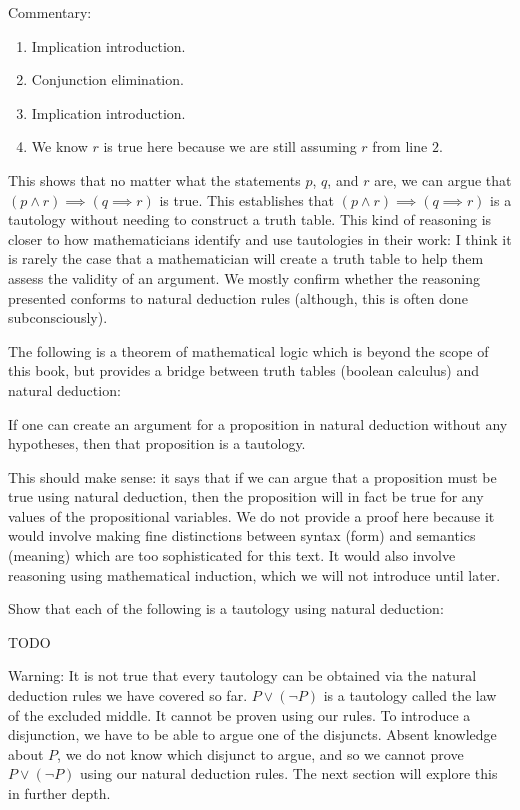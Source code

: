 Commentary:

\begin{enumerate}
	\item Implication introduction.
	\item Conjunction elimination.
	\item Implication introduction.
	\item We know $r$ is true here because we are still assuming $r$ from line $2$.
	\end{enumerate}

This shows that no matter what the statements $p$, $q$, and $r$ are, we can argue that $(p \wedge r) \implies ( q \implies r )$ is true.  This establishes that $(p \wedge r) \implies ( q \implies r )$ is a tautology without needing to construct a truth table.  This kind of reasoning is closer to how mathematicians identify and use tautologies in their work:  I think it is rarely the case that a mathematician will create a truth table to help them assess the validity of an argument.  We mostly confirm whether the reasoning presented conforms to natural deduction rules (although, this is often done subconsciously).

The following is a theorem of mathematical logic which is beyond the scope of this book, but provides a bridge between truth tables (boolean calculus) and natural deduction:

\begin{theorem}
	If one can create an argument for a proposition in natural deduction without any hypotheses, then that proposition is a tautology.
\end{theorem}

This should make sense:  it says that if we can argue that a proposition must be true using natural deduction, then the proposition will in fact be true for any values of the propositional variables.  We do not provide a proof here because it would involve making fine distinctions between syntax (form) and semantics (meaning) which are too sophisticated for this text.  It would also involve reasoning using mathematical induction, which we will not introduce until later.

\begin{xca}
		Show that each of the following is a tautology using natural deduction:
		
		TODO
	\end{xca}

Warning:  It is not true that every tautology can be obtained via the natural deduction rules we have covered so far.  $P \vee (\neg P)$ is a tautology called the law of the excluded middle. It cannot be proven using our rules.  To introduce a disjunction, we have to be able to argue one of the disjuncts.  Absent knowledge about $P$, we do not know which disjunct to argue, and so we cannot prove $P \vee (\neg P)$  using our natural deduction rules.  The next section will explore this in further depth.

